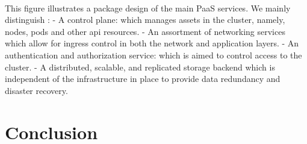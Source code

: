 \paragraph{}This figure illustrates a package design of the main PaaS services. We mainly distinguish :
-	A control plane: which manages assets in the cluster, namely, nodes, pods and other api resources.
-	An assortment of networking services which allow for ingress control in both the network and application layers.
-	An authentication and authorization service: which is aimed to control access to the cluster.
-	A distributed, scalable, and replicated storage backend which is independent of the infrastructure in place to provide data redundancy and disaster recovery.

\section*{Conclusion}




